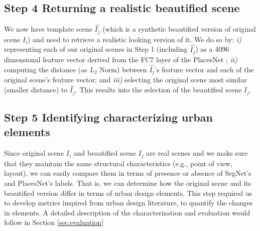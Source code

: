 \subsection*{Step 4 Returning a realistic beautified scene}
We now have template scene $\hat{I_j}$ (which is a synthetic beautified version of original scene $I_i$) and need to retrieve a realistic looking version of it. We do so by: \emph{i)} representing each of our original scenes in Step 1 (including $\hat{I_j}$) as a 4096 dimensional feature vector derived from the FC7 layer of the PlacesNet \cite{zhou2014learning}; \emph{ii)} computing the distance (as $L_2$ Norm) between $\hat{I_j}$'s feature vector and each of the original scene's feature vector; and \emph{iii)} selecting the original scene most similar (smaller distance) to $\hat{I_j}$. This results into the selection of the beautified scene $I_j$.


\subsection*{Step 5 Identifying  characterizing urban elements}
Since original scene $I_i$ and beautified scene $I_j$ are real scenes and we make sure that they maintain the same structural characteristics (e.g., point of view, layout), we can easily compare them in terms of presence or absence of SegNet's and PlacesNet's labels. That is, we can determine how the original scene and its beautified version differ in terms of urban design elements. This step required us to develop metrics inspired from urban design literature, to quantify the changes in elements. A detailed description of the characterization and evaluation would follow in Section \ref{sec:evaluation}




